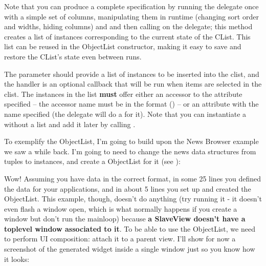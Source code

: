 \documentclass[a4paper]{howto}
\begin{document}
Note that you can produce a complete  specification by
running the delegate once with a simple set of columns, manipulating
them in runtime (changing sort order and widths, hiding columns) and and
then calling  on the delegate; this method creates
a list of  instances corresponding to the current state of
the CList. This list can be reused in the ObjectList constructor,
making it easy to save and restore the CList's state even between runs.

The  parameter should provide a list of instances
to be inserted into the clist, and the handler is an optional callback
that will be run when items are selected in the clist. The instances in
the list {\bf must} offer either an accessor to the attribute specified
-- the accessor name must be in the format () -- or an attribute with the name specified (the
delegate will do a  for it). Note that you can
instantiate a  without a list and add it later by
calling .

To exemplify the ObjectList, I'm going to build upon the News Browser
example we saw a while back. I'm going to need to change the news data
structures from tuples to instances, and create a ObjectList for
it (see ):



Wow! Assuming you have data in the correct format, in some 25 lines you
defined the data for your applications, and in about 5 lines you
set up and created the ObjectList.  This example, though, doesn't do
anything (try running it - it doesn't even flash a window open, which is
what normally happens if you create a window but don't run the mainloop)
because {\bf a SlaveView doesn't have a toplevel window associated to
it}. To be able to use the ObjectList, we need to perform UI
composition: attach it to a parent view. I'll show for now a screenshot
of the generated widget inside a single window just so you know how it
looks:

\end{document}
